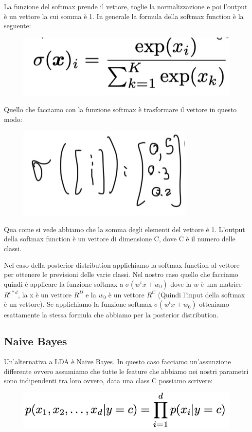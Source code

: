\documentclass[14pt]{extreport}
\begin{document}
La funzione del softmax prende il vettore, toglie la normalizzazione e poi l'output è un vettore la cui somma è 1. In generale la formula della
softmax function è la seguente:

\begin{figure}[H]
	\centering
	\includegraphics[width=0.4\linewidth]{181.jpeg}
\end{figure}

Quello che facciamo con la funzione softmax è trasformare il vettore in questo modo:
\begin{figure}[H]
	\centering
	\includegraphics[width=0.3\linewidth]{182.jpeg}
\end{figure}
Qua come si vede abbiamo che la somma degli elementi del vettore è 1. L'output della softmax function è un vettore di dimensione C, dove C è il numero
delle classi.

Nel caso della posterior distribution applichiamo la softmax function al vettore per ottenere le previsioni delle varie classi. Nel nostro caso quello
che facciamo quindi è applicare la funzione softmax a $\sigma(w^tx+w_0)$ dove la $w$ è una matrice $R^{c*d}$, la x è un vettore $R^D$ e la $w_0$ è un
vettore $R^C$ (Quindi l'input della softmax è un vettore). Se applichiamo la funzione softmax $\sigma(w^tx+w_0)$ otteniamo esattamente la stessa
formula che abbiamo per la posterior distribution.


\subsection{Naive Bayes}

Un'alternativa a LDA è Naive Bayes. In questo caso facciamo un'assunzione differente ovvero assumiamo che tutte le feature che abbiamo nei nostri
parametri sono indipendenti tra loro ovvero, data una class C possiamo scrivere:

\begin{figure}[H]
	\centering
	\includegraphics[width=0.5\linewidth]{183.jpeg}
\end{figure}
\end{document}
